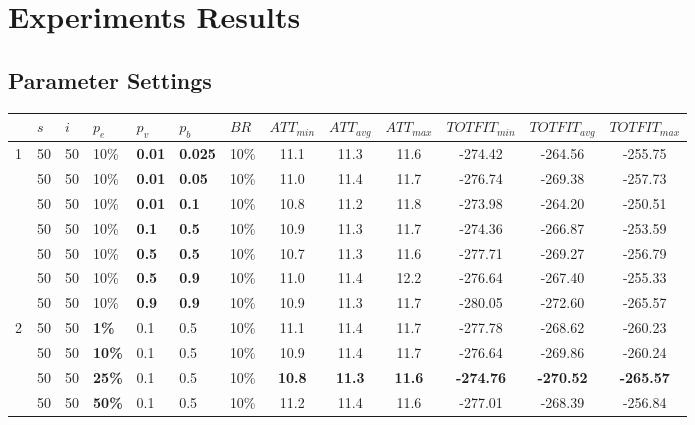 \chapter{Experiments Results}
\label{appendixC}

\section{Parameter Settings}

\begin{sidewaystable}
    \begin{tabular}{|l|l|l|l|l|l|l||c|c|c|c|c|c|}
    \hline
    ~ & $s$ & $i$ & $p_{e}$ & $p_{v}$ & $p_{b}$ & $BR$ & $ATT_{min}$ & $ATT_{avg}$ & $ATT_{max}$ & $TOTFIT_{min}$ & $TOTFIT_{avg}$ & $TOTFIT_{max}$\\
    \hline
    1 & 50 & 50 & 10\% & \textbf{0.01} & \textbf{0.025} & 10\% & 11.1 & 11.3 & 11.6 & -274.42 & -264.56 & -255.75 \\
    ~ & 50 & 50 & 10\% & \textbf{0.01} & \textbf{0.05} & 10\% & 11.0 & 11.4 & 11.7 & -276.74 & -269.38 & -257.73 \\
    ~ & 50 & 50 & 10\% & \textbf{0.01} & \textbf{0.1} & 10\% & 10.8 & 11.2 & 11.8 & -273.98 & -264.20 & -250.51 \\
    ~ & 50 & 50 & 10\% & \textbf{0.1} & \textbf{0.5} & 10\% & 10.9 & 11.3 & 11.7 & -274.36 & -266.87 & -253.59 \\
    ~ & 50 & 50 & 10\% & \textbf{0.5} & \textbf{0.5} & 10\% & 10.7 & 11.3 & 11.6 & -277.71 & -269.27 & -256.79 \\
    ~ & 50 & 50 & 10\% & \textbf{0.5} & \textbf{0.9} & 10\% & 11.0 & 11.4 & 12.2 & -276.64 & -267.40 & -255.33 \\
    ~ & 50 & 50 & 10\% & \textbf{0.9} & \textbf{0.9} & 10\% & 10.9 & 11.3 & 11.7 & -280.05 & -272.60 & -265.57 \\
    \hline
    2 & 50 & 50 & \textbf{1\%} & 0.1 & 0.5 & 10\% & 11.1 & 11.4 & 11.7 & -277.78 & -268.62 & -260.23 \\
    ~ & 50 & 50 & \textbf{10\%} & 0.1 & 0.5 & 10\% & 10.9 & 11.4 & 11.7 & -276.64 & -269.86 & -260.24 \\
    ~ & 50 & 50 & \textbf{25\%} & 0.1 & 0.5 & 10\% &  \textbf{10.8} & \textbf{11.3} & \textbf{11.6} & \textbf{-274.76} & \textbf{-270.52} & \textbf{-265.57} \\
    ~ & 50 & 50 & \textbf{50\%} & 0.1 & 0.5 & 10\% &  11.2 & 11.4 & 11.6 & -277.01 & -268.39 & -256.84 \\

\end{tabular}
\end{sidewaystable}

